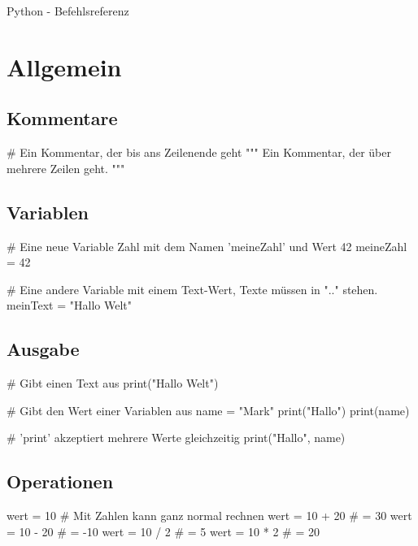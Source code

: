 \documentclass{\VorlagenPfad/coderdojokatext}
\newcommand{\Titel}{Python - Befehlsreferenz}
\begin{document}
\setcounter{chapter}{1}

\begin{center}
	{\huge \Titel}
\end{center}

\section{Allgemein}
\subsection{Kommentare}
\begin{pythoncode}
# Ein Kommentar, der bis ans Zeilenende geht
"""
Ein Kommentar, der über
mehrere Zeilen geht.
"""
\end{pythoncode}
\subsection{Variablen}
\begin{pythoncode}
# Eine neue Variable Zahl mit dem Namen 'meineZahl' und Wert 42
meineZahl = 42

# Eine andere Variable mit einem Text-Wert, Texte müssen in ".." stehen.
meinText = "Hallo Welt"
\end{pythoncode}

\subsection{Ausgabe}

\begin{pythoncode}
# Gibt einen Text aus
print("Hallo Welt")

\end{pythoncode}
\begin{pythoncode}
# Gibt den Wert einer Variablen aus
name = "Mark"
print("Hallo")
print(name)

# 'print' akzeptiert mehrere Werte gleichzeitig
print("Hallo", name)
\end{pythoncode}

\subsection{Operationen}
\begin{pythoncode}
wert  = 10 # Mit Zahlen kann ganz normal rechnen
wert = 10 + 20  # = 30
wert = 10 - 20  # = -10
wert = 10 / 2   # = 5
wert = 10 * 2   # = 20
\end{pythoncode}
\end{document}
